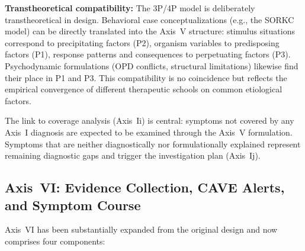 \documentclass[11pt,a4paper]{article}
\begin{document}
\textbf{Transtheoretical compatibility:} The 3P/4P model is deliberately transtheoretical in design. Behavioral case conceptualizations (e.g., the SORKC model) can be directly translated into the Axis~V structure: stimulus situations correspond to precipitating factors (P2), organism variables to predisposing factors (P1), response patterns and consequences to perpetuating factors (P3). Psychodynamic formulations (OPD conflicts, structural limitations) likewise find their place in P1 and P3. This compatibility is no coincidence but reflects the empirical convergence of different therapeutic schools on common etiological factors.

The link to coverage analysis (Axis~Ii) is central: symptoms not covered by any Axis~I diagnosis are expected to be examined through the Axis~V formulation. Symptoms that are neither diagnostically nor formulationally explained represent remaining diagnostic gaps and trigger the investigation plan (Axis~Ij).

\subsection{Axis~VI: Evidence Collection, CAVE Alerts, and Symptom Course}

Axis~VI has been substantially expanded from the original design and now comprises four components:
\end{document}
